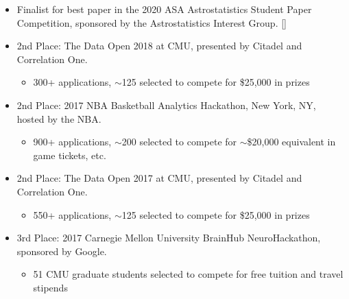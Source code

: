 \documentclass[letterpaper,10pt]{extarticle}
\newcommand{\myhref}[3][blue]{\href{#2}{\color{#1}{#3}}}
\begin{document}
\begin{itemize}[leftmargin=0.6cm, rightmargin=0.3cm]
\vspace{-0.075cm}

\item Finalist for best paper in the 2020 ASA Astrostatistics Student Paper Competition, sponsored by the Astrostatistics Interest Group. [\myhref{https://astrostat.org/jsm2020/index.html\#session-401}{Link}]

\vspace{0.1cm}

\item 2nd Place: The Data Open 2018 at CMU, presented by Citadel and Correlation One.
\begin{itemize}
\vspace{-0.15cm}
\item 300+ applications, $\sim$125 selected to compete for \$25,000 in prizes
\end{itemize}

\vspace{0.01cm}

\item 2nd Place: 2017 NBA Basketball Analytics Hackathon, New York, NY, hosted by the NBA.
\begin{itemize}
\vspace{-0.15cm}
\item 900+ applications, $\sim$200 selected to compete for $\sim$\$20,000 equivalent in game tickets, etc.
\end{itemize}

\vspace{0.01cm}

\item 2nd Place: The Data Open 2017 at CMU, presented by Citadel and Correlation One.
\begin{itemize}
\vspace{-0.15cm}
\item 550+ applications, $\sim$125 selected to compete for \$25,000 in prizes
\end{itemize}

\vspace{0.01cm}

\item 3rd Place: 2017 Carnegie Mellon University BrainHub NeuroHackathon, sponsored by Google.
\begin{itemize}
\vspace{-0.15cm}
\item 51 CMU graduate students selected to compete for free tuition and travel stipends
\end{itemize}
\end{itemize}
\end{document}
